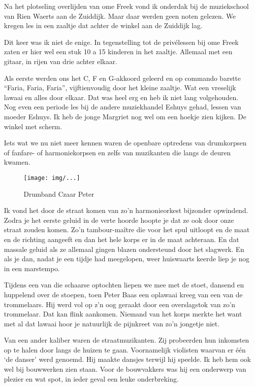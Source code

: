 \documentclass[10pt,twoside,openright]{memoir}
\begin{document}
Na het plotseling overlijden van ome Freek vond ik onderdak bij de muziekschool van Rien Waerts aan de Zuiddijk. Maar daar werden geen noten gelezen. We kregen les in een zaaltje dat achter de winkel aan de Zuiddijk lag. 

Dit keer was ik niet de enige. In tegenstelling tot de privélessen bij ome Freek zaten er hier wel een stuk 10 a 15 kinderen in het zaaltje. Allemaal met een gitaar, in rijen van drie achter elkaar. 

Als eerste werden ons het C, F en G-akkoord geleerd en op commando barstte “Faria, Faria, Faria”, vijftienvoudig door het kleine zaaltje. Wat een vreselijk lawaai en alles door elkaar. Dat was heel erg en heb ik niet lang volgehouden. Nog even een periode les bij de andere muziekhandel Eshuys gehad, lessen van moeder Eshuys. Ik heb de jonge Margriet nog wel om een hoekje zien kijken. De winkel met scherm.

Iets wat we nu niet meer kennen waren de openbare optredens van drumkorpsen of fanfare- of harmoniekorpsen en zelfs van muzikanten die langs de deuren kwamen. 

\begin{figure}[t]
\texttt{[image: img/...]}
\caption{Drumband Czaar Peter}
\end{figure}

Ik vond het door de straat komen van zo’n harmonieorkest bijzonder opwindend. Zodra je het eerste geluid in de verte hoorde hoopte je dat ze ook door onze straat zouden komen. Zo’n tambour-maître die voor het spul uitloopt en de maat en de richting aangeeft en dan het hele korps er in de maat achteraan. En dat massale geluid als ze allemaal gingen blazen ondersteund door het slagwerk. En als je dan, nadat je een tijdje had meegelopen, weer huiswaarts keerde liep je nog in een marstempo.

Tijdens een van die schaarse optochten liepen we mee met de stoet, dansend en huppelend over de stoepen, toen Peter Baas een oplawaai kreeg van een van de trommelaars. Hij werd vol op z’n oog geraakt door een overslagstok van zo’n trommelaar. 
Dat kan flink aankomen. Niemand van het korps merkte het want met al dat lawaai hoor je natuurlijk de pijnkreet van zo’n jongetje niet.

Van een ander kaliber waren de straatmuzikanten. Zij probeerden hun inkomsten op te halen door langs de huizen te gaan. Voornamelijk violisten waarvan er één ‘de danser’ werd genoemd. Hij maakte dansjes terwijl hij speelde. Ik heb hem ook wel bij bouwwerken zien staan. Voor de bouwvakkers was hij een onderwerp van plezier en wat spot, in ieder geval een leuke onderbreking.
\end{document}
